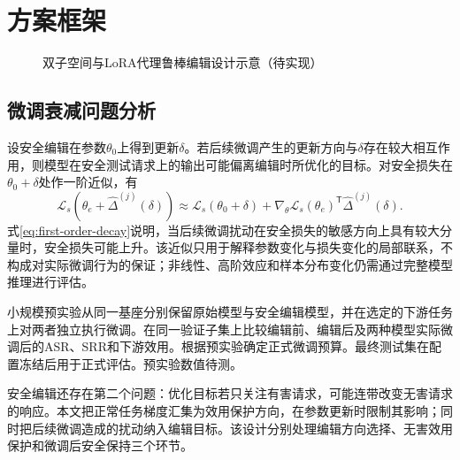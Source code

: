 \section{方案框架}

\begin{figure}[htbp]
 \centering
 \caption{双子空间与LoRA代理鲁棒编辑设计示意（待实现）}
 \label{fig:ch2-framework}
\end{figure}

\subsection{微调衰减问题分析}

设安全编辑在参数$\theta_0$上得到更新$\delta$。若后续微调产生的更新方向与$\delta$存在较大相互作用，则模型在安全测试请求上的输出可能偏离编辑时所优化的目标。对安全损失在$\theta_0+\delta$处作一阶近似，有
\begin{equation}
  \mathcal{L}_{s}(\theta_e+\widehat{\Delta}^{(j)}(\delta))
  \approx \mathcal{L}_{s}(\theta_0+\delta)
  +\nabla_{\theta}\mathcal{L}_{s}(\theta_e)^{\mathsf T}\widehat{\Delta}^{(j)}(\delta).
  \label{eq:first-order-decay}
\end{equation}
式\eqref{eq:first-order-decay}说明，当后续微调扰动在安全损失的敏感方向上具有较大分量时，安全损失可能上升。该近似只用于解释参数变化与损失变化的局部联系，不构成对实际微调行为的保证；非线性、高阶效应和样本分布变化仍需通过完整模型推理进行评估。

小规模预实验从同一基座分别保留原始模型与安全编辑模型，并在选定的下游任务上对两者独立执行微调。在同一验证子集上比较编辑前、编辑后及两种模型实际微调后的ASR、SRR和下游效用。根据预实验确定正式微调预算。最终测试集在配置冻结后用于正式评估。预实验数值待测。

安全编辑还存在第二个问题：优化目标若只关注有害请求，可能连带改变无害请求的响应。本文把正常任务梯度汇集为效用保护方向，在参数更新时限制其影响；同时把后续微调造成的扰动纳入编辑目标。该设计分别处理编辑方向选择、无害效用保护和微调后安全保持三个环节。

